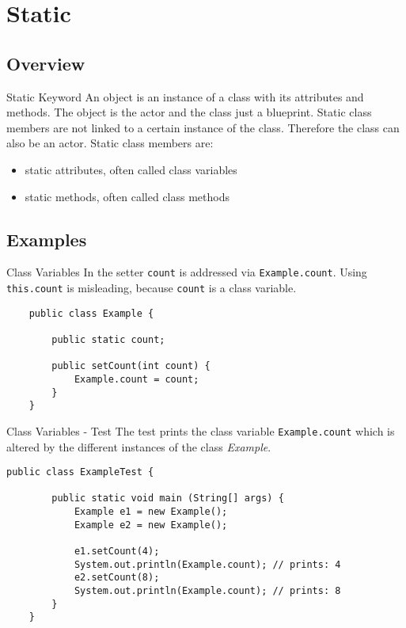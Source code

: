 \section{Static}
\subsection{Overview}
\begin{frame}{Static Keyword}
    An object is an instance of a class with its attributes and methods.
    The object is the actor and the class just a blueprint.
    \vfill
    Static class members are not linked to a certain instance of the class.
    Therefore the class can also be an actor.
    \vfill
    Static class members are:
    \begin{itemize}
        \item static attributes, often called class variables
        \item static methods, often called class methods
    \end{itemize}
\end{frame}

\subsection{Examples}
\begin{frame}[fragile]{Class Variables}
    In the setter \texttt{count} is addressed via \texttt{Example.count}.
    Using \texttt{this.count} is misleading, because \texttt{count} is a class variable.    
    \begin{lstlisting}
    public class Example {
    
        public static count;

        public setCount(int count) {
            Example.count = count;
        }
    }
    \end{lstlisting}
\end{frame}

\begin{frame}[fragile]{Class Variables - Test}
    The test prints the class variable \texttt{Example.count} which is altered
    by the different instances of the class \emph{Example}.    
    \begin{lstlisting}[basicstyle=\ttfamily\scriptsize]
    public class ExampleTest {
    
        public static void main (String[] args) {
            Example e1 = new Example();
            Example e2 = new Example();
            
            e1.setCount(4);
            System.out.println(Example.count); // prints: 4
            e2.setCount(8);
            System.out.println(Example.count); // prints: 8
        }
    }
    \end{lstlisting}
\end{frame}

